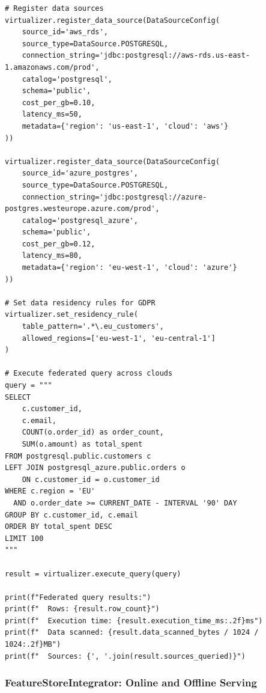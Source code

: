 \begin{lstlisting}[style=python, caption=DataVirtualizer with Federated Queries]
# Register data sources
virtualizer.register_data_source(DataSourceConfig(
    source_id='aws_rds',
    source_type=DataSource.POSTGRESQL,
    connection_string='jdbc:postgresql://aws-rds.us-east-1.amazonaws.com/prod',
    catalog='postgresql',
    schema='public',
    cost_per_gb=0.10,
    latency_ms=50,
    metadata={'region': 'us-east-1', 'cloud': 'aws'}
))

virtualizer.register_data_source(DataSourceConfig(
    source_id='azure_postgres',
    source_type=DataSource.POSTGRESQL,
    connection_string='jdbc:postgresql://azure-postgres.westeurope.azure.com/prod',
    catalog='postgresql_azure',
    schema='public',
    cost_per_gb=0.12,
    latency_ms=80,
    metadata={'region': 'eu-west-1', 'cloud': 'azure'}
))

# Set data residency rules for GDPR
virtualizer.set_residency_rule(
    table_pattern='.*\.eu_customers',
    allowed_regions=['eu-west-1', 'eu-central-1']
)

# Execute federated query across clouds
query = """
SELECT
    c.customer_id,
    c.email,
    COUNT(o.order_id) as order_count,
    SUM(o.amount) as total_spent
FROM postgresql.public.customers c
LEFT JOIN postgresql_azure.public.orders o
    ON c.customer_id = o.customer_id
WHERE c.region = 'EU'
  AND o.order_date >= CURRENT_DATE - INTERVAL '90' DAY
GROUP BY c.customer_id, c.email
ORDER BY total_spent DESC
LIMIT 100
"""

result = virtualizer.execute_query(query)

print(f"Federated query results:")
print(f"  Rows: {result.row_count}")
print(f"  Execution time: {result.execution_time_ms:.2f}ms")
print(f"  Data scanned: {result.data_scanned_bytes / 1024 / 1024:.2f}MB")
print(f"  Sources: {', '.join(result.sources_queried)}")
\end{lstlisting}

\subsubsection{FeatureStoreIntegrator: Online and Offline Serving}

